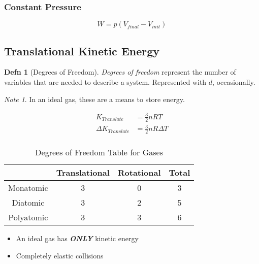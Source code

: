 \documentclass[10pt,letterpaper,final,twoside,notitlepage]{article}
\numberwithin{equation}{section} %
\theoremstyle{definition}
\newtheorem{definition}{Defn} %
\theoremstyle{remark}
\newtheorem{note}{Note}[definition] %
\begin{document}
		\subsubsection*{Constant Pressure} \label{subsubsec:Work Done Under Constant Pressure}
			\begin{equation}
				W = p \left(V_{final}-V_{init} \right)
			\end{equation}
			
	\subsection*{Translational Kinetic Energy} \label{subsec:Translational Kinetic Energy}
		\begin{definition}[Degrees of Freedom] \label{def:Degrees of Freedom}
			\emph{Degrees of freedom} represent the number of variables that are needed to describe a system. Represented with $d$, occasionally.
			\begin{note}
				In an ideal gas, these are a means to store energy.
			\end{note}
		\end{definition}
		\begin{equation} \label{eq:Translational Kinetic Energy}
			\begin{aligned}
				K_{Translate} &= \frac{3}{2}nRT \\
				\Delta K_{Translate} &= \frac{3}{2}nR \Delta T \\
			\end{aligned}
		\end{equation}
		\begin{table}[h!]
			\centering
			\begin{tabular}{c|c|c|c}
				 & Translational & Rotational & Total \\ \hline
				Monatomic & 3 & 0 & 3 \\ \hline
				Diatomic & 3 & 2 & 5 \\ \hline
				Polyatomic & 3 & 3 & 6 \\
			\end{tabular}
			\caption{Degrees of Freedom Table for Gases}
			\label{tab:Degrees of Freedom}
		\end{table}
		\begin{itemize}[noitemsep, nolistsep]
			\item An ideal gas has \emph{\textbf{ONLY}} kinetic energy
			\item Completely elastic collisions
		\end{itemize}
		
\end{document}
